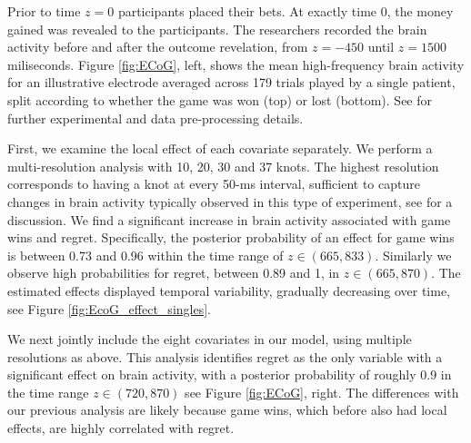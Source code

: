 Prior to time $z=0$ participants placed their bets. At exactly time $0$, the money gained was revealed to the participants. The researchers recorded the brain activity before and after the outcome revelation, from $z=-450$ until $z=1500$ miliseconds.
Figure \ref{fig:ECoG}, left, shows the mean  high-frequency brain activity for an illustrative electrode averaged across 179 trials %
played by a single patient, split according to whether the game was won (top) or lost (bottom). 
See \cite{saez:2018} for further experimental and data pre-processing details.
 
First, we examine the local effect of each covariate separately. We  perform a multi-resolution analysis with 10, 20, 30 and 37 knots. The highest resolution corresponds to having a knot at every 50-ms interval, sufficient to capture changes in brain activity typically observed in this type of experiment, see \cite{saez:2018} for a discussion.
We find a significant increase in brain activity associated with game wins and regret. Specifically, the posterior probability of an effect for game wins is between 0.73 and 0.96 within the time range of $z \in (665,833)$. Similarly we observe high probabilities for regret, between 0.89 and 1, in $z \in (665, 870)$. The estimated effects displayed temporal variability, gradually decreasing over time, see Figure \ref{fig:EcoG_effect_singles}. 

We next jointly include the eight covariates in our model, using multiple resolutions as above. 
This analysis identifies  regret %
as the only variable with a significant effect on brain activity, with a posterior probability of roughly 0.9 in the time range $z \in (720, 870)$ %
see Figure \ref{fig:ECoG}, right.
The differences with our previous analysis are likely because game wins, which before also had local effects, are highly correlated with regret.

